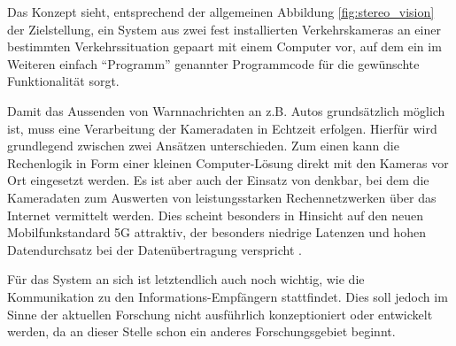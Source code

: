 Das Konzept sieht, entsprechend der allgemeinen Abbildung \ref{fig:stereo_vision} der Zielstellung, ein System aus zwei fest installierten Verkehrskameras an einer bestimmten Verkehrssituation gepaart mit einem Computer vor, auf dem ein im Weiteren einfach ``Programm'' genannter Programmcode für die gewünschte Funktionalität sorgt.\kleinerabstand

\noindent Damit das Aussenden von Warnnachrichten an z.B. Autos grundsätzlich möglich ist, muss eine Verarbeitung der Kameradaten in Echtzeit erfolgen. Hierfür wird grundlegend zwischen zwei Ansätzen unterschieden. Zum einen kann die Rechenlogik in Form einer kleinen Computer-Lösung direkt mit den Kameras vor Ort eingesetzt werden. Es ist aber auch der Einsatz von  denkbar, bei dem die Kameradaten zum Auswerten von leistungsstarken Rechennetzwerken über das Internet vermittelt werden. Dies scheint besonders in Hinsicht auf den neuen Mobilfunkstandard 5G attraktiv, der besonders niedrige Latenzen und hohen Datendurchsatz bei der Datenübertragung verspricht \cite{5g}.\kleinerabstand

\noindent Für das System an sich ist letztendlich auch noch wichtig, wie die Kommunikation zu den Informations-Empfängern stattfindet. Dies soll jedoch im Sinne der aktuellen Forschung nicht ausführlich konzeptioniert oder entwickelt werden, da an dieser Stelle schon ein anderes Forschungsgebiet beginnt. 

